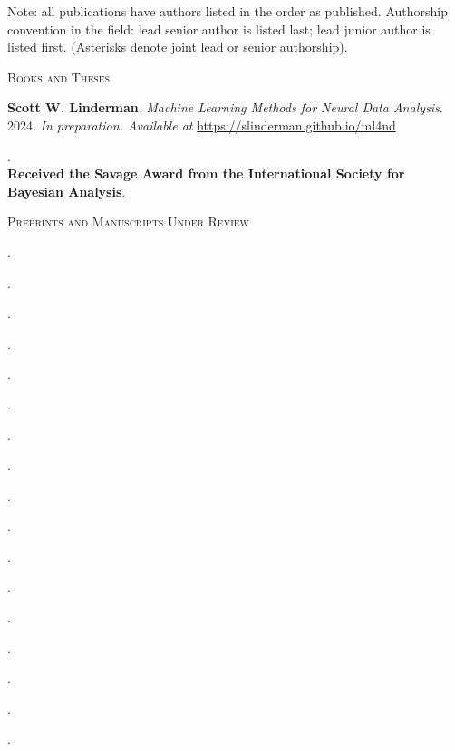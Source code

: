 \documentclass[10pt]{article}
\renewcommand{\section}[1]{\pagebreak[3]%
    \hyphenpenalty=10000%
    \vspace{1.3\baselineskip}%
    \noindent\llap{\scshape\smash{\parbox[t]{\marginparwidth}{\raggedright #1}}}%
    \vspace{-\baselineskip}\par}
\begin{document}
\section{Publications}

Note: all publications have authors listed in the order as published. Authorship convention in the field: lead senior author is listed last; lead junior author is listed first. (Asterisks denote joint lead or senior authorship).

\vspace{.5em}

{\small\scshape Books and Theses}
\begin{outerlist}
\item \textbf{Scott W. Linderman}. \textit{Machine Learning Methods for Neural Data Analysis}. 2024. \textit{In preparation. Available at} \url{https://slinderman.github.io/ml4nd}
\item {}. \\
  \textbf{Received the Savage Award from the International Society for Bayesian Analysis}. 
\end{outerlist}

\vspace{0.5em}

{\small\scshape Preprints and Manuscripts Under Review}
\begin{outerlist}
\item {}.
\item {}.
\item {}.
\item {}.
\item {}.
\item {}.
\item {}.
\item {}.
\item {}.
\item {}.
\item {}.
\item {}.
\item {}.
\item {}.
\item {}.
\item {}.
\item {}.
\end{outerlist}
\end{document}
